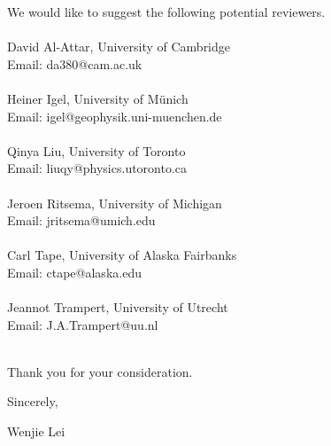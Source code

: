 \documentclass[11pt]{article}
\begin{document}
\par \noindent
We would like to suggest the following potential 
reviewers. \\
~ \\
David Al-Attar, University of Cambridge \\
Email: da380@cam.ac.uk\\
~ \\
Heiner Igel, University of M\"unich \\
Email: igel@geophysik.uni-muenchen.de \\
~ \\
Qinya Liu, University of Toronto\\
Email:  liuqy@physics.utoronto.ca \\
~ \\
Jeroen Ritsema, University of Michigan \\
Email:  jritsema@umich.edu \\
~ \\
Carl Tape, University of Alaska Fairbanks \\
Email:  ctape@alaska.edu \\
~ \\
Jeannot Trampert, University of Utrecht \\
Email: J.A.Trampert@uu.nl \\
~ \\

\par  \noindent
Thank you for your consideration.\\
\par \noindent
Sincerely, \\
\par \noindent
Wenjie Lei
\end{document}
